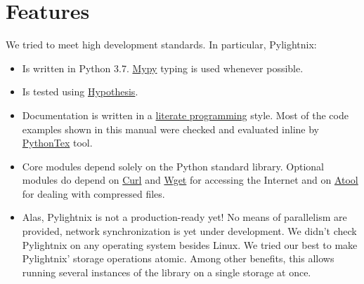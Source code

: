 \section{Features}

We tried to meet high development standards. In particular, Pylightnix:
\begin{itemize}
  \item Is written in Python 3.7. \href{http://mypy-lang.org/}{Mypy} typing is
    used whenever possible.
  \item Is tested using \href{https://pypi.org/project/hypothesis/}{Hypothesis}.
  \item Documentation is written in a
    \href{https://en.wikipedia.org/wiki/Literate_programming}{literate
    programming} style. Most of the code examples shown in this manual were
    checked and evaluated inline by
    \href{https://github.com/gpoore/pythontex}{PythonTex} tool.
  \item Core modules depend solely on the Python standard library. Optional
    modules do depend on \href{https://curl.se/}{Curl} and
    \href{https://www.gnu.org/software/wget/}{Wget} for accessing the Internet
    and on \href{https://www.nongnu.org/atool/}{Atool} for dealing with
    compressed files.
  \item Alas, Pylightnix is not a production-ready yet! No means of parallelism
    are provided, network synchronization is yet under development.  We didn't
    check Pylightnix on any operating system besides Linux. We tried our best
    to make Pylightnix' storage operations atomic. Among other benefits,
    this allows running several instances of the library on a single
    storage at once.
\end{itemize}

